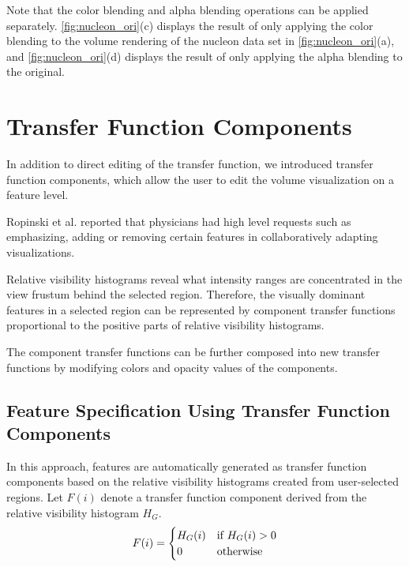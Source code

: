 \documentclass[twoside,twocolumn,10pt]{article}
\begin{document}
Note that the color blending and alpha blending operations can be applied separately. \autoref{fig:nucleon_ori}(c) displays the result of only applying the color blending to the volume rendering of the nucleon data set in \autoref{fig:nucleon_ori}(a), and \autoref{fig:nucleon_ori}(d) displays the result of only applying the alpha blending to the original.

\section{Transfer Function Components} \label{transfer_function_components}
In addition to direct editing of the transfer function, we introduced transfer function components, which allow the user to edit the volume visualization on a feature level.

Ropinski et al. \cite{ropinski_stroke-based_2008} reported that physicians had high level requests such as emphasizing, adding or removing certain features in collaboratively adapting visualizations.

Relative visibility histograms reveal what intensity ranges are concentrated in the view frustum behind the selected region. Therefore, the visually dominant features in a selected region can be represented by component transfer functions proportional to the positive parts of relative visibility histograms.

The component transfer functions can be further composed into new transfer functions by modifying colors and opacity values of the components.




\subsection{Feature Specification Using Transfer Function Components}
In this approach, features are automatically generated as transfer function components based on the relative visibility histograms created from user-selected regions.
Let $F(i)$ denote a transfer function component derived from the relative visibility histogram $H_{G}$.
\[
F(i) =
\begin{cases}
H_{G}(i) & \text{if $ H_{G}(i)>0 $} \\
0 & \text{otherwise}
\end{cases}
\]
\end{document}
